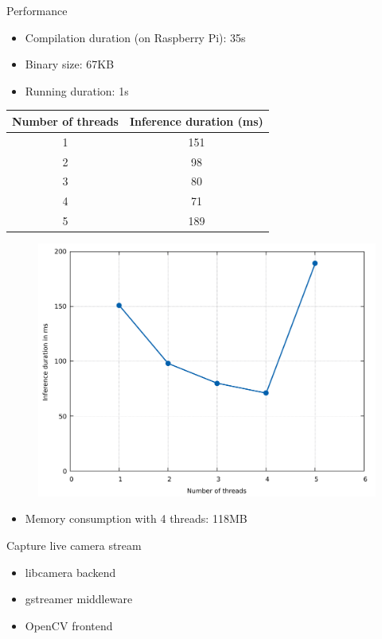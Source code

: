 \begin{frame}{Performance}
  \begin{itemize}
	\item Compilation duration (on Raspberry Pi): 35s
	\item Binary size: 67KB
	\item Running duration: 1s
  \end{itemize}
  \begin{table}
    {\tiny
	\begin{tabular}{|c|c|}
	  \hline
		\textbf{Number of threads} & \textbf{Inference duration (ms)} \\
	  \hline
		1 & 151 \\
	  \hline
		2 & 98 \\
	  \hline
		3 & 80 \\
	  \hline
		4 & 71 \\
	  \hline
		5 & 189 \\
	  \hline
	\end{tabular}
	}
  \end{table}
  \begin{figure}
	\includegraphics[width=\linewidth,height=0.45\textheight,keepaspectratio]{images/inference_duration_rps.pdf}
  \end{figure}
  \begin{itemize}
	\item Memory consumption with 4 threads: 118MB
  \end{itemize}
\end{frame}

\begin{frame}{Capture live camera stream}
  \begin{itemize}
	\item libcamera backend
	\item gstreamer middleware
	\item OpenCV frontend
  \end{itemize}
\end{frame}

